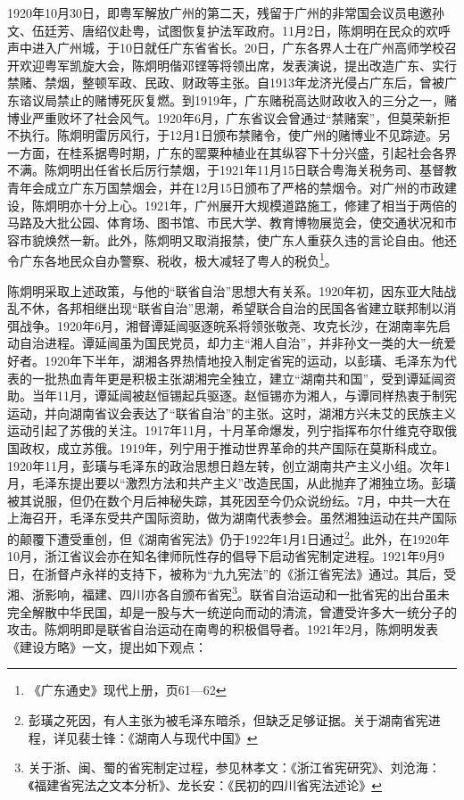 \indent 1920年10月30日，即粤军解放广州的第二天，残留于广州的非常国会议员电邀孙文、伍廷芳、唐绍仪赴粤，试图恢复护法军政府。11月2日，陈炯明在民众的欢呼声中进入广州城，于10日就任广东省省长。20日，广东各界人士在广州高师学校召开欢迎粤军凯旋大会，陈炯明偕邓铿等将领出席，发表演说，提出改造广东、实行禁赌、禁烟，整顿军政、民政、财政等主张。自1913年龙济光侵占广东后，曾被广东谘议局禁止的赌博死灰复燃。到1919年，广东赌税高达财政收入的三分之一，赌博业严重败坏了社会风气。1920年6月，广东省议会曾通过“禁赌案”，但莫荣新拒不执行。陈炯明雷厉风行，于12月1日颁布禁赌令，使广州的赌博业不见踪迹。另一方面，在桂系据粤时期，广东的罂粟种植业在其纵容下十分兴盛，引起社会各界不满。陈炯明出任省长后厉行禁烟，于1921年11月15日联合粤海关税务司、基督教青年会成立广东万国禁烟会，并在12月15日颁布了严格的禁烟令。对广州的市政建设，陈炯明亦十分上心。1921年，广州展开大规模道路施工，修建了相当于两倍的马路及大批公园、体育场、图书馆、市民大学、教育博物展览会，使交通状况和市容市貌焕然一新。此外，陈炯明又取消报禁，使广东人重获久违的言论自由。他还令广东各地民众自办警察、税收，极大减轻了粤人的税负\footnote{《广东通史》现代上册，页61—62}。

陈炯明采取上述政策，与他的“联省自治”思想大有关系。1920年初，因东亚大陆战乱不休，各邦相继出现“联省自治”思潮，希望联合自治的民国各省建立联邦制以消弭战争。1920年6月，湘督谭延闿驱逐皖系将领张敬尧、攻克长沙，在湖南率先启动自治进程。谭延闿虽为国民党员，却力主“湘人自治”，并非孙文一类的大一统爱好者。1920年下半年，湖湘各界热情地投入制定省宪的运动，以彭璜、毛泽东为代表的一批热血青年更是积极主张湖湘完全独立，建立“湖南共和国”，受到谭延闿资助。当年11月，谭延闿被赵恒锡起兵驱逐。赵恒锡亦为湘人，与谭同样热衷于制宪运动，并向湖南省议会表达了“联省自治”的主张。这时，湖湘方兴未艾的民族主义运动引起了苏俄的关注。1917年11月，十月革命爆发，列宁指挥布尔什维克夺取俄国政权，成立苏俄。1919年，列宁用于推动世界革命的共产国际在莫斯科成立。1920年11月，彭璜与毛泽东的政治思想日趋左转，创立湖南共产主义小组。次年1月，毛泽东提出要以“激烈方法和共产主义”改造民国，从此抛弃了湘独立场。彭璜被其说服，但仍在数个月后神秘失踪，其死因至今仍众说纷纭。7月，中共一大在上海召开，毛泽东受共产国际资助，做为湖南代表参会。虽然湘独运动在共产国际的颠覆下遭受重创，但《湖南省宪法》仍于1922年1月1日通过\footnote{彭璜之死因，有人主张为被毛泽东暗杀，但缺乏足够证据。关于湖南省宪进程，详见裴士锋：《湖南人与现代中国》}。此外，在1920年10月，浙江省议会亦在知名律师阮性存的倡导下启动省宪制定进程。1921年9月9日，在浙督卢永祥的支持下，被称为“九九宪法”的《浙江省宪法》通过。其后，受湘、浙影响，福建、四川亦各自颁布省宪\footnote{关于浙、闽、蜀的省宪制定过程，参见林孝文：《浙江省宪研究》、刘沧海：《福建省宪法之文本分析》、龙长安：《民初的四川省宪法述论》}。联省自治运动和一批省宪的出台虽未完全解散中华民国，却是一股与大一统逆向而动的清流，曾遭受许多大一统分子的攻击。陈炯明即是联省自治运动在南粤的积极倡导者。1921年2月，陈炯明发表《建设方略》一文，提出如下观点：

